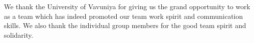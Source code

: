 \documentclass[12pt, a4paper]{report}
\begin{document}
We thank the University of Vavuniya for giving us the grand opportunity to work as a team which has indeed promoted our team work spirit and communication skills. We also thank the individual group members for the good team spirit and solidarity.



\tableofcontents
\listoffigures

\newpage
{} %

\newpage

\newpage

\newpage

\newpage

\newpage



\newpage


\newpage
\newpage









\newpage


 
\end{document}
